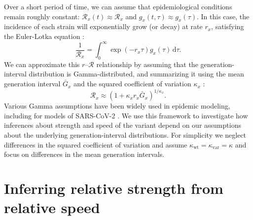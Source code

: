 \documentclass[12pt]{article}
\newcommand{\RR}{\ensuremath{{\mathcal R}}\xspace}
\newcommand{\dd}[1]{\ensuremath{\, \mathrm{d}#1}}
\newcommand{\dtau}{\dd{\tau}}
\begin{document}
Over a short period of time, we can assume that epidemiological conditions remain roughly constant: $\RR_x(t) \approx \RR_x$ and $g_x(t, \tau) \approx g_x(\tau)$.
In this case, the incidence of each strain will exponentially grow (or decay) at rate $r_x$, satisfying the Euler-Lotka equation \citep{wallinga2007generation}:
\begin{equation}
\frac{1}{\RR_x} = \int_0^\infty \exp(- r_x \tau) g_x(\tau) \dtau.
\end{equation}
We can approximate this $r$--$\RR$ relationship by assuming that the generation-interval distribution is Gamma-distributed, and summarizing it using the mean generation interval $\bar{G}_x$ and the squared coefficient of variation $\kappa_x$ \citep{park2019practical}:
\begin{equation}
\RR_x \approx (1 + \kappa_x r_x \bar{G}_x)^{1/\kappa_x}.
\end{equation}
Various Gamma assumptions have been widely used in epidemic modeling, including for models of SARS-CoV-2 \citep{doi:10.1098/rsif.2020.0144}.
We use this framework to investigate how inferences about strength and speed of the variant depend on our assumptions about the underlying generation-interval distributions.
For simplicity we neglect differences in the squared coefficient of variation and assume $\kappa_{\mathrm{wt}} = \kappa_{\mathrm{var}} = \kappa$ and focus on differences in the mean generation intervals.

\section{Inferring relative strength from relative speed}
\end{document}
